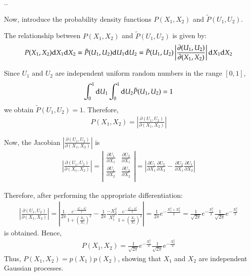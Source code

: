\documentclass[aspectratio=169,dvipdfmx,cjk,handout,hyperref,8pt]{beamer} %
\theoremstyle{example}
\begin{document}
\begin{frame}{\thesection.\thesubsection.~\insertsubsection}
\item Now, introduce the probability density functions $P(X_1, X_2)$ and $\tilde {P} (U_1, U_2)$. 
\item The relationship between $P(X_1, X_2)$ and $\tilde {P} (U_1, U_2)$ is given by:
\begin{eqnarray}
P(X_1,X_2){\rm d}X_1{\rm d}X_2 = \tilde{P}(U_1,U_2){\rm d}U_1{\rm d}U_2=\tilde{P}(U_1,U_2) \left|\frac{\partial(U_1,U_2)}{\partial(X_1,X_2)}\right|{\rm d}X_1{\rm d}X_2
\end{eqnarray}
\item Since $U_1$ and $U_2$ are independent uniform random numbers in the range $[0, 1]$, 
\begin{eqnarray}
\int_0^1{\rm d}U_1\int_0^1{\rm d}U_2\tilde{P}(U_1,U_2)=1
\end{eqnarray}
we obtain $\tilde{P}(U_1,U_2)=1$. Therefore,
\begin{eqnarray}
P(X_1,X_2)= \left | \frac{\partial(U_1,U_2)}{\partial(X_1,X_2)} \right | 
\end{eqnarray}
\item Now, the Jacobian $|\frac{ \partial (U_1, U_2)}{\partial(X_1, X_2)}|$ is
\begin{eqnarray}
 \left|\frac{\partial(U_1,U_2)}{\partial(X_1,X_2)}\right| = \left|
    \begin{array}{cc}
      \frac{\partial U_1}{\partial X_1} & \frac{\partial U_2}{\partial X_1}  \\
            \frac{\partial U_1}{\partial X_2} & \frac{\partial U_2}{\partial X_2}  \\
    \end{array}
  \right| = \left|\frac{\partial U_1}{\partial X_1}\frac{\partial U_2}{\partial X_2}-\frac{\partial U_2}{\partial X_1}  \frac{\partial U_1}{\partial X_2}\right |
\end{eqnarray}
\item Therefore, after performing the appropriate differentiation:
{\small
\begin{eqnarray}
\left |\frac{\partial(U_1,U_2)}{\partial(X_1,X_2)}\right | = \left|\frac{1}{2\pi}\frac{e^{-\frac{X_1^2+X_2^2}{2}}}{1+(\frac{X_2}{X_1})^2} 
-\frac{1}{2\pi}\frac{-X_2^2}{X_1^2}\frac{e^{-\frac{X_1^2+X_2^2}{2}}}{1+(\frac{X_2}{X_1})^2}
\right| = \frac{1}{2\pi} e^{-\frac{X_1^2+X_2^2}{2}}= \frac{1}{\sqrt{2\pi}}e^{-\frac{X_1^2}{2}}\frac{1}{\sqrt{2\pi}}e^{-\frac{X_2^2}{2}}
\end{eqnarray}
} 
is obtained. Hence,
\begin{eqnarray}
P(X_1,X_2)= \frac{1}{\sqrt{2\pi}}e^{-\frac{X_1^2}{2}}\frac{1}{\sqrt{2\pi}}e^{-\frac{X_2^2}{2}} 
\end{eqnarray}
Thus, $P(X_1, X _ 2) =p (X_1)p(X_2) $, showing that $X_1$ and $X_2$ are independent Gaussian processes.


\end{frame}
\end{document}
